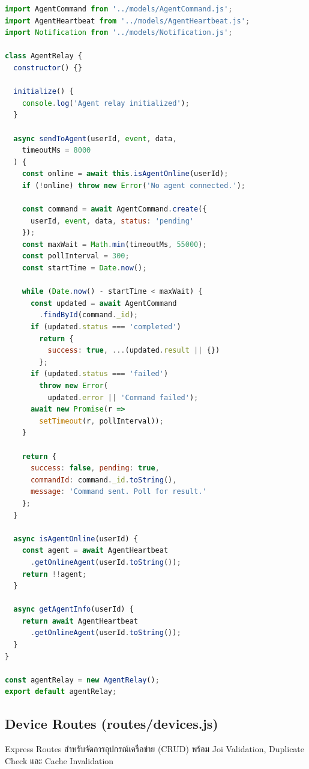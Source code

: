 \begin{lstlisting}[language=JavaScript, caption={services/agentRelay.js -- Agent Relay (HTTP Polling)}]
import AgentCommand from '../models/AgentCommand.js';
import AgentHeartbeat from '../models/AgentHeartbeat.js';
import Notification from '../models/Notification.js';

class AgentRelay {
  constructor() {}

  initialize() {
    console.log('Agent relay initialized');
  }

  async sendToAgent(userId, event, data,
    timeoutMs = 8000
  ) {
    const online = await this.isAgentOnline(userId);
    if (!online) throw new Error('No agent connected.');

    const command = await AgentCommand.create({
      userId, event, data, status: 'pending'
    });
    const maxWait = Math.min(timeoutMs, 55000);
    const pollInterval = 300;
    const startTime = Date.now();

    while (Date.now() - startTime < maxWait) {
      const updated = await AgentCommand
        .findById(command._id);
      if (updated.status === 'completed')
        return {
          success: true, ...(updated.result || {})
        };
      if (updated.status === 'failed')
        throw new Error(
          updated.error || 'Command failed');
      await new Promise(r =>
        setTimeout(r, pollInterval));
    }

    return {
      success: false, pending: true,
      commandId: command._id.toString(),
      message: 'Command sent. Poll for result.'
    };
  }

  async isAgentOnline(userId) {
    const agent = await AgentHeartbeat
      .getOnlineAgent(userId.toString());
    return !!agent;
  }

  async getAgentInfo(userId) {
    return await AgentHeartbeat
      .getOnlineAgent(userId.toString());
  }
}

const agentRelay = new AgentRelay();
export default agentRelay;
\end{lstlisting}

\subsection{Device Routes (routes/devices.js)}
\hspace*{1.3em}
Express Routes สำหรับจัดการอุปกรณ์เครือข่าย (CRUD) พร้อม Joi Validation, Duplicate Check และ Cache Invalidation


